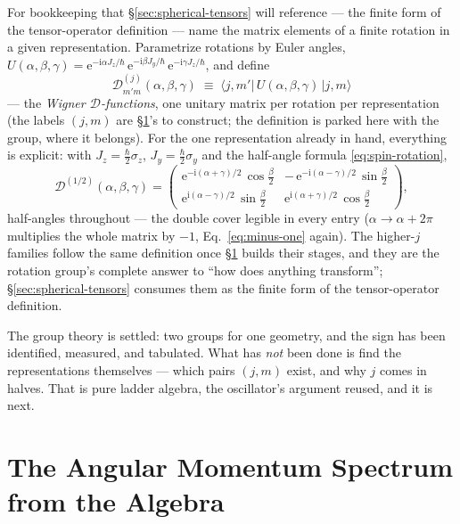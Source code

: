 \documentclass[11pt]{article}
\theoremstyle{plain}
\theoremstyle{definition}
\theoremstyle{remark}
\newcommand{\ee}{\mathrm{e}}
\newcommand{\ii}{\mathrm{i}}
\newcommand{\ket}[1]{\lvert #1 \rangle}
\newcommand{\bra}[1]{\langle #1 \rvert}
\begin{document}
For bookkeeping that \S\ref{sec:spherical-tensors} will reference
--- the finite form of the tensor-operator definition --- name
the matrix elements of a finite rotation in a given representation.
Parametrize rotations by Euler angles,
$U(\alpha, \beta, \gamma)
= \ee^{-\ii\alpha J_z/\hbar}\,
  \ee^{-\ii\beta J_y/\hbar}\,
  \ee^{-\ii\gamma J_z/\hbar}$, and define
\begin{equation}
  \mathscr D^{(j)}_{m'm}(\alpha, \beta, \gamma)
  \;\equiv\;
  \bra{j, m'}\,U(\alpha, \beta, \gamma)\,\ket{j, m}
\end{equation}
--- the \emph{Wigner $\mathscr D$-functions}, one unitary matrix
per rotation per representation (the labels $(j, m)$ are
\S\ref{sec:J-spectrum}'s to construct; the definition is parked
here with the group, where it belongs). For the one representation
already in hand, everything is explicit: with
$J_z = \tfrac\hbar2\sigma_z$, $J_y = \tfrac\hbar2\sigma_y$ and the
half-angle formula \eqref{eq:spin-rotation},
\begin{equation}
  \mathscr D^{(1/2)}(\alpha, \beta, \gamma)
  =
  \begin{pmatrix}
    \ee^{-\ii(\alpha + \gamma)/2}\,\cos\frac\beta2
    & -\,\ee^{-\ii(\alpha - \gamma)/2}\,\sin\frac\beta2
    \\[4pt]
    \ee^{\ii(\alpha - \gamma)/2}\,\sin\frac\beta2
    & \ee^{\ii(\alpha + \gamma)/2}\,\cos\frac\beta2
  \end{pmatrix},
  \label{eq:D-half}
\end{equation}
half-angles throughout --- the double cover legible in every entry
($\alpha \to \alpha + 2\pi$ multiplies the whole matrix by $-1$,
Eq.~\eqref{eq:minus-one} again). The
higher-$j$ families follow the same definition once
\S\ref{sec:J-spectrum} builds their stages, and they are the
rotation group's complete answer to ``how does anything
transform''; \S\ref{sec:spherical-tensors} consumes them as the
finite form of the tensor-operator definition.

\medskip
\noindent
The group theory is settled: two groups for one geometry, and the
sign has been identified, measured, and tabulated. What has
\emph{not} been done
is find the representations themselves --- which pairs $(j, m)$
exist, and why $j$ comes in halves. That is pure ladder algebra, the
oscillator's argument reused, and it is next.


\section{The Angular Momentum Spectrum from the Algebra}
\label{sec:J-spectrum}
\end{document}

